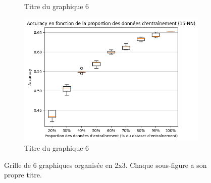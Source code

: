 \documentclass[12pt]{article}
\begin{document}
\begin{figure}[H]
\begin{subfigure}[t]{0.35\textwidth}
        \caption{Titre du graphique 6}
    \end{subfigure}
    \hfill
    \begin{subfigure}[t]{0.35\textwidth}
        \centering
        \includegraphics[width=\textwidth]{static/knn_cam_15.png}
        \caption{Titre du graphique 6}
    \end{subfigure}

    \caption{Grille de 6 graphiques organisée en 2x3. Chaque sous-figure a son propre titre.}
\end{figure}
\end{document}
